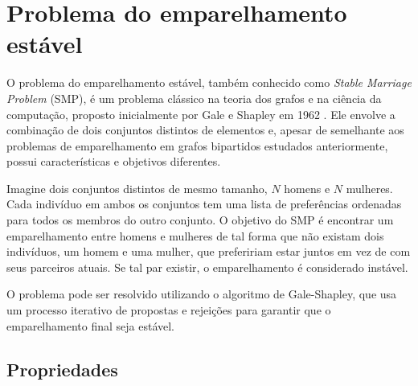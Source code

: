 \section{Problema do emparelhamento estável}

O problema do emparelhamento estável, também conhecido como \textit{Stable Marriage Problem} (SMP), é um problema clássico na teoria dos grafos e na ciência da computação, proposto inicialmente por Gale e Shapley em 1962 \cite{kleinberg}. Ele envolve a combinação de dois conjuntos distintos de elementos e, apesar de semelhante aos problemas de emparelhamento em grafos bipartidos estudados anteriormente, possui características e objetivos diferentes.

Imagine dois conjuntos distintos de mesmo tamanho, $N$ homens e $N$ mulheres. Cada indivíduo em ambos os conjuntos tem uma lista de preferências ordenadas para todos os membros do outro conjunto. O objetivo do SMP é encontrar um emparelhamento entre homens e mulheres de tal forma que não existam dois indivíduos, um homem e uma mulher, que prefeririam estar juntos em vez de com seus parceiros atuais. Se tal par existir, o emparelhamento é considerado instável.

O problema pode ser resolvido utilizando o algoritmo de Gale-Shapley, que usa um processo iterativo de propostas e rejeições para garantir que o emparelhamento final seja estável.

\subsection{Propriedades}

